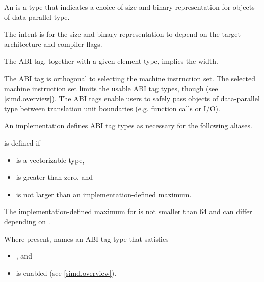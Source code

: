\begin{itemdescr}
\pnum\label{wording.ABI.tag}
An  is a type that indicates a choice of size and binary
representation for objects of data-parallel type.
\begin{note}
  The intent is for the size and binary representation to depend on the target
  architecture and compiler flags.
\end{note}
The ABI tag, together with a given element type, implies the width.

\pnum
\begin{note}
The ABI tag is orthogonal to selecting the machine instruction set.
The selected machine instruction set limits the usable ABI tag types, though
(see \ref{simd.overview}).
The ABI tags enable users to safely pass objects of data-parallel type between
translation unit boundaries (e.g. function calls or I/O).
\end{note}

\pnum
An implementation defines ABI tag types as necessary for the following aliases.

\pnum\label{wording.deducet}
 is defined if
\begin{itemize}
  \item {} is a vectorizable type,
  \item {} is greater than zero, and
  \item {} is not larger than an implementation-defined maximum.
\end{itemize}
The implementation-defined maximum for  is not smaller than 64
and can differ depending on .

\pnum
Where present,  names an ABI tag type that satisfies
\begin{itemize}
  \item {}, and
  \item {} is enabled (see \ref{simd.overview}).
\end{itemize}



\end{itemdescr}
